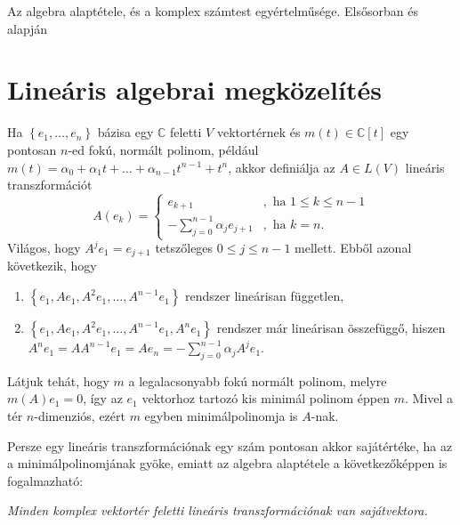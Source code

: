 \documentclass[9pt, showtrims]{memoir}
\theoremstyle{plain}
\theoremstyle{remark}
\theoremstyle{definition}
\begin{document}
Az algebra alaptétele, és a komplex számtest egyértelműsége. Elsősorban \parencite{MR1415833} és \parencite{10.2307/3647746} alapján
\section{Lineáris algebrai megközelítés}
Ha $\left\{ e_1,\dots,e_n \right\}$ bázisa egy $\mathbb{C}$ feletti $V$ vektortérnek
és $m\left( t \right)\in\mathbb{C}\left[ t \right]$ egy pontosan $n$-ed fokú, 
normált polinom,
például
$m\left( t \right)=\alpha_0+\alpha_1 t+\dots+\alpha_{n-1}t^{n-1}+t^{n}$,
akkor definiálja az $A\in L\left( V \right)$ lineáris transzformációt
\[
    A\left( e_k \right)=
    \begin{cases}
        e_{k+1}&, \text{ ha } 1\leq k \leq n-1\\
        -\sum_{j=0}^{n-1}\alpha_j e_{j+1}&, \text{ ha } k=n.
    \end{cases}
\]
Világos, hogy $A^je_1=e_{j+1}$ tetszőleges $0\leq j\leq n-1$ mellett.
Ebből azonal következik, hogy 
\begin{enumerate}
    \item 
    $\left\{ e_1, Ae_1,A^2e_1,\dots,A^{n-1}e_1\right\}$ rendszer lineárisan független,
    \item
    $\left\{ e_1, Ae_1,A^2e_1,\dots,A^{n-1}e_1,A^ne_1\right\}$ rendszer már lineárisan összefüggő,
    hiszen
    $A^ne_1=AA^{n-1}e_1=Ae_n=-\sum_{j=0}^{n-1}\alpha_j A^je_1$.
\end{enumerate}
Látjuk tehát, hogy $m$ a legalacsonyabb fokú normált polinom, melyre
$m\left( A \right)e_1=0$,
így az $e_1$ vektorhoz tartozó kis minimál polinom éppen $m$.
Mivel a tér $n$-dimenziós, ezért $m$ egyben minimálpolinomja is $A$-nak.

Persze egy lineáris transzformációnak egy szám pontosan akkor sajátértéke,
ha az a minimálpolinomjának gyöke,
emiatt 
az algebra alaptétele a következőképpen is fogalmazható:
\begin{center}
\emph{Minden komplex vektortér feletti lineáris transzformációnak van sajátvektora.}
\end{center}
\end{document}
